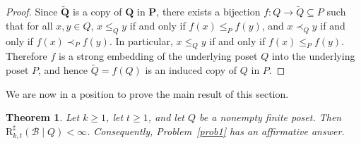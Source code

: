 \documentclass[twoside,12pt]{article}
\newtheorem{theorem}{Theorem}[section]
\newcommand{\BRs}{\mathrm{R}^{\sharp}}
\begin{document}
\begin{proof}
Since $\widetilde{\mathbf Q}$ is a copy of $\mathbf Q$ in $\mathbf P$, there exists
a bijection $f:Q\to \widetilde Q\subseteq P$ such that for all $x,y\in Q$,
$x\le_Q y$ if and only if $f(x)\le_P f(y)$, and
$x\prec_Q y$ if and only if $f(x)\prec_P f(y)$. In particular,
$x\le_Q y$ if and only if $f(x)\le_P f(y)$. Therefore $f$ is a strong embedding of
the underlying poset $Q$ into the underlying poset $P$, and hence
$\widetilde Q=f(Q)$ is an induced copy of $Q$ in $P$.
\end{proof}
We are now in a position to prove the main result of this section.
\begin{theorem}\label{th:prob1-affirmative}
Let $k\ge 1$, let $t\ge 1$, and let $Q$ be a nonempty finite poset. Then
$\BRs_{k,t}(\mathcal B\mid Q)<\infty$. Consequently, Problem~\ref{prob1} has an
affirmative answer.
\end{theorem}
\end{document}
